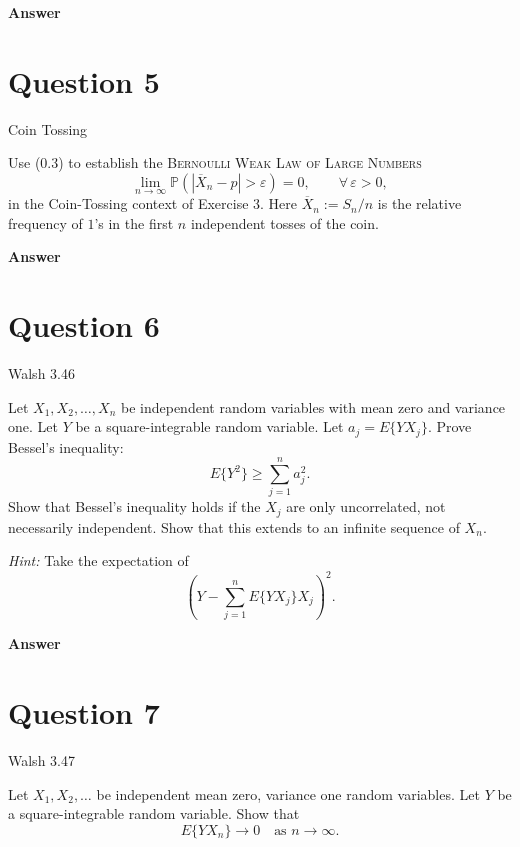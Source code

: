 \documentclass[letterpaper]{article}
\begin{document}
		
		\textbf{Answer}
		
		\clearpage
		
		\section{Question 5}
		{\color{deepred} Coin Tossing} 
		
		Use (0.3) to establish the \textsc{Bernoulli Weak Law of Large Numbers}
		\[
		\lim_{n \to \infty}
		\mathbb{P}\!\left(\left|\overline{X}_n - p\right| > \varepsilon\right)
		=
		0,
		\qquad \forall \,\varepsilon > 0,
		\]
		in the Coin-Tossing context of Exercise 3.
		Here $\overline{X}_n := S_n/n$ is the relative frequency of $1$’s
		in the first $n$ independent tosses of the coin.
		
		
		\textbf{Answer}
		
		\clearpage
		
		\section{Question 6}
		
		{\color{deepred} Walsh 3.46} 
		
		Let $X_1, X_2, \ldots, X_n$ be independent random variables with mean zero and
		variance one. Let $Y$ be a square-integrable random variable.
		Let $a_j = E\{Y X_j\}$.
		Prove Bessel's inequality:
		\[
		E\{Y^2\} \ge \sum_{j=1}^n a_j^2.
		\]
		Show that Bessel's inequality holds if the $X_j$ are only uncorrelated,
		not necessarily independent.
		Show that this extends to an infinite sequence of $X_n$.
		
		\medskip
		
		\textit{Hint:} Take the expectation of
		\[
		\left( Y - \sum_{j=1}^n E\{Y X_j\} X_j \right)^2.
		\]
		
		
		
		\textbf{Answer}
		
		\clearpage
		
		
		\section{Question 7}
		
		
		{\color{deepred} Walsh 3.47} 
		
		Let $X_1, X_2, \ldots$ be independent mean zero, variance one random variables.
		Let $Y$ be a square-integrable random variable.
		Show that
		\[
		E\{Y X_n\} \longrightarrow 0
		\quad \text{as } n \to \infty.
		\]
		
\end{document}
